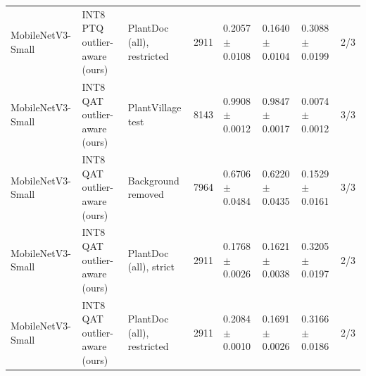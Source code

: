 \begin{table}[t]
\begin{tabular}{llllllll}
MobileNetV3-Small & INT8 PTQ outlier-aware (ours) & PlantDoc (all), restricted & 2911 & 0.2057 $\pm$ 0.0108 & 0.1640 $\pm$ 0.0104 & 0.3088 $\pm$ 0.0199 & 2/3 \\
MobileNetV3-Small & INT8 QAT outlier-aware (ours) & PlantVillage test & 8143 & 0.9908 $\pm$ 0.0012 & 0.9847 $\pm$ 0.0017 & 0.0074 $\pm$ 0.0012 & 3/3 \\
MobileNetV3-Small & INT8 QAT outlier-aware (ours) & Background removed & 7964 & 0.6706 $\pm$ 0.0484 & 0.6220 $\pm$ 0.0435 & 0.1529 $\pm$ 0.0161 & 3/3 \\
MobileNetV3-Small & INT8 QAT outlier-aware (ours) & PlantDoc (all), strict & 2911 & 0.1768 $\pm$ 0.0026 & 0.1621 $\pm$ 0.0038 & 0.3205 $\pm$ 0.0197 & 2/3 \\
MobileNetV3-Small & INT8 QAT outlier-aware (ours) & PlantDoc (all), restricted & 2911 & 0.2084 $\pm$ 0.0010 & 0.1691 $\pm$ 0.0026 & 0.3166 $\pm$ 0.0186 & 2/3 \\
\bottomrule
\end{tabular}
\end{table}
